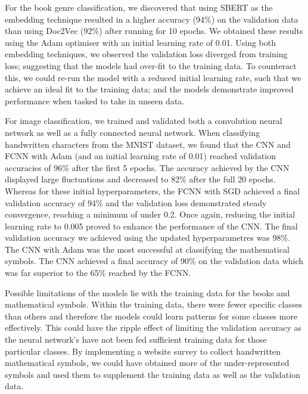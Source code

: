 \documentclass[twocolumn,pra,floatfix]{revtex4-2}
\begin{document}
        For the book genre classification, we discovered that using SBERT as the embedding technique resulted in a higher accuracy (94\%) on the validation data than using Doc2Vec (92\%) after running for 10 epochs. We obtained these results using the Adam optimiser with an initial learning rate of 0.01. Using both embedding techniques, we observed the validation loss diverged from training loss; suggesting that the models had over-fit to the training data. To counteract this, we could re-run the model with a reduced initial learning rate, such that we achieve an ideal fit to the training data; and the models demonstrate improved performance when tasked to take in unseen data.

        For image classification, we trained and validated both a convolution neural network as well as a fully connected neural network. When classifying handwritten characters from the MNIST dataset, we found that the CNN and FCNN with Adam (and an initial learning rate of 0.01) reached validation accuracies of 96\% after the first 5 epochs. The accuracy achieved by the CNN displayed large fluctuations and decreased to 82\% after the full 20 epochs. Whereas for these initial hyperparameters, the FCNN with SGD achieved a final validation accuracy of 94\% and the validation loss demonstrated steady convergence, reaching a minimum of under 0.2. Once again, reducing the initial learning rate to 0.005 proved to enhance the performance of the CNN. The final validation accuracy we achieved using the updated hyperparametres was 98\%. The CNN with Adam was the most successful at classifying the mathematical symbols. The CNN achieved a final accuracy of 90\% on the validation data which was far superior to the 65\% reached by the FCNN. 

        Possible limitations of the models lie with the training data for the books and mathematical symbols. Within the training data, there were fewer specific classes than others and therefore the models could learn patterns for some classes more effectively. This could have the ripple effect of limiting the validation accuracy as the neural network's have not been fed sufficient training data for those particular classes. By implementing a website survey to collect handwritten mathematical symbols, we could have obtained more of the under-represented symbols and used them to supplement the training data as well as the validation data. 

\pagebreak

\setlength{\parskip}{0pt}


\end{document}

